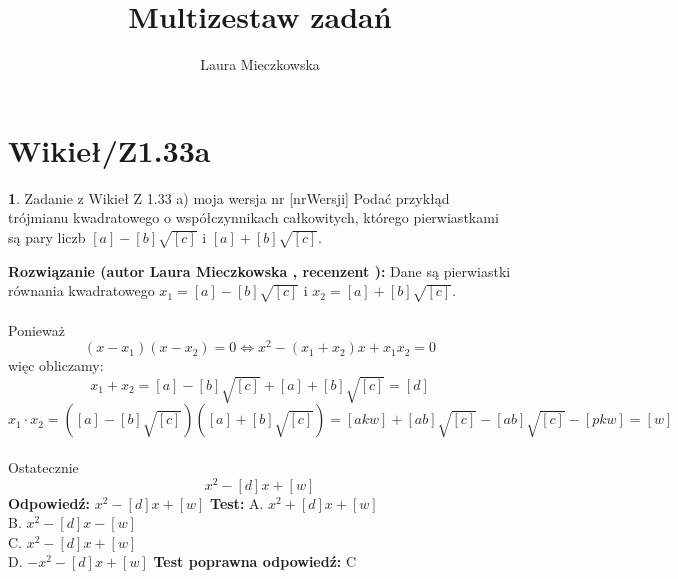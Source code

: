 \documentclass[12pt, a4paper]{article}
\title{Multizestaw zadań}
\author{Laura Mieczkowska}
\date{}
\theoremstyle{definition} %
\newtheorem{zad}{}
\newcommand{\kategoria}[1]{\section{#1}} %
\newcommand{\zadStart}[1]{\begin{zad}#1\newline} %
\newcommand{\zadStop}{\end{zad}}   %
\newcommand{\rozwStart}[2]{\noindent \textbf{Rozwiązanie (autor #1 , recenzent #2): }\newline} %
\newcommand{\odpStart}{\noindent \textbf{Odpowiedź:}\newline}    %
\newcommand{\odpStop}{\newline}                                             %
\newcommand{\testStart}{\noindent \textbf{Test:}\newline} %
\newcommand{\testStop}{\newline} %
\newcommand{\kluczStart}{\noindent \textbf{Test poprawna odpowiedź:}\newline} %
\newcommand{\kluczStop}{\newline} %
\begin{document}
\maketitle


\kategoria{Wikieł/Z1.33a}
\zadStart{Zadanie z Wikieł Z 1.33 a) moja wersja nr [nrWersji]}
Podać przykłąd trójmianu kwadratowego o współczynnikach całkowitych, którego pierwiastkami są pary liczb $[a]-[b]\sqrt{[c]}$ i $[a]+[b]\sqrt{[c]}$.
\zadStop
\rozwStart{Laura Mieczkowska}{}
Dane są pierwiastki równania kwadratowego $x_1=[a]-[b]\sqrt{[c]}$ i $x_2=[a]+[b]\sqrt{[c]}$.
\\\\Ponieważ
$$(x-x_1)(x-x_2)=0 \Leftrightarrow x^2-(x_1+x_2)x+x_1x_2=0$$
więc obliczamy:
$$x_1+x_2=[a]-[b]\sqrt{[c]}+[a]+[b]\sqrt{[c]}=[d]$$
$$x_1\cdot x_2=([a]-[b]\sqrt{[c]})([a]+[b]\sqrt{[c]})=[akw]+[ab]\sqrt{[c]}-[ab]\sqrt{[c]}-[pkw]=[w]$$
\\Ostatecznie
$$x^2-[d]x+[w]$$
\odpStart
$x^2-[d]x+[w]$
\odpStop
\testStart
A. $x^2+[d]x+[w]$ \\
B. $x^2-[d]x-[w]$ \\
C. $x^2-[d]x+[w]$ \\
D. $-x^2-[d]x+[w]$ 
\testStop
\kluczStart
C
\kluczStop
\end{document}
